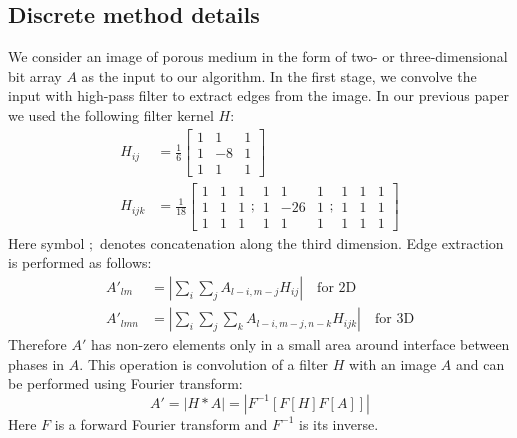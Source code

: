 \documentclass[preprint]{elsarticle}
\begin{document}
\subsection{Discrete method details}
We consider an image of porous medium in the form of two- or three-dimensional bit
array $A$ as the input to our algorithm. In the first stage, we convolve the
input with high-pass filter to extract edges from the image. In our previous
paper \cite{Samarin} we used the following filter kernel $H$:
\begin{equation}
  \begin{aligned}
    H_{ij} &= \frac{1}{6} \left[
      \begin{array}{ccc}
        1 & 1 & 1 \\
        1 & -8 & 1 \\
        1 & 1 & 1
      \end{array}
      \right] \\
    H_{ijk} &= \frac{1}{18} \left[
      \begin{array}{ccc}
        1 & 1 & 1 \\
        1 & 1 & 1 \\
        1 & 1 & 1
      \end{array} ;
      \begin{array}{ccc}
        1 & 1 & 1 \\
        1 & -26 & 1 \\
        1 & 1 & 1
      \end{array} ;
      \begin{array}{ccc}
        1 & 1 & 1 \\
        1 & 1 & 1 \\
        1 & 1 & 1
      \end{array}
      \right]
  \end{aligned}
  \label{eq:filter-3x3}
\end{equation}
Here symbol $;$ denotes concatenation along the third dimension. Edge extraction
is performed as follows:
\begin{equation}
  \begin{aligned}
    A'_{lm}  &= \left| \sum_i\sum_j A_{l-i, m-j}H_{ij} \right| \quad \text{for 2D} \\
    A'_{lmn} &= \left| \sum_i\sum_j\sum_k A_{l-i, m-j, n-k}H_{ijk} \right| \quad \text{for 3D}
  \end{aligned}
\end{equation}
Therefore $A'$ has non-zero elements only in a small area around interface
between phases in $A$. This operation is convolution of a filter $H$ with an
image $A$ and can be performed using Fourier transform:
\begin{equation}
  A' = |H*A| = |F^{-1}[F[H] F[A]]|
\end{equation}
Here $F$ is a forward Fourier transform and $F^{-1}$ is its inverse.
\end{document}
